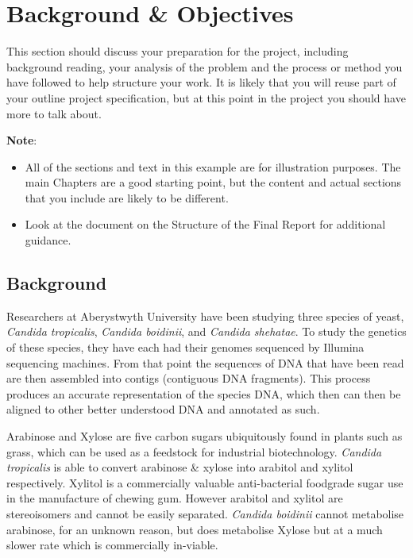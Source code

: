 \chapter{Background \& Objectives}

This section should discuss your preparation for the project, including background reading, your analysis of the problem and the process or method you have followed to help structure your work.  It is likely that you will reuse part of your outline project specification, but at this point in the project you should have more to talk about. 

\textbf{Note}: 

\begin{itemize}
   \item All of the sections and text in this example are for illustration purposes. The main Chapters are a good starting point, but the content and actual sections that you include are likely to be different.
   
   \item Look at the document on the Structure of the Final Report for additional guidance. 
   
\end{itemize}

\section{Background}
Researchers at Aberystwyth University have been studying three species of yeast, \textit{Candida tropicalis}, \textit{Candida boidinii}, and \textit{Candida shehatae}. To study the genetics of these species, they have each had their genomes sequenced by Illumina sequencing machines. From that point the sequences of DNA that have been read are then assembled into contigs (contiguous DNA fragments). This process produces an accurate representation of the species DNA, which then can then be aligned to other better understood DNA and annotated as such.

Arabinose and Xylose are five carbon sugars ubiquitously found in plants such as grass, which can be used as a feedstock for industrial biotechnology. \textit{Candida tropicalis} is able to convert arabinose \& xylose into arabitol and xylitol respectively. Xylitol is a commercially valuable anti-bacterial foodgrade sugar use in the manufacture of chewing gum. However arabitol and xylitol are stereoisomers and cannot be easily separated. \textit{Candida boidinii} cannot metabolise arabinose, for an unknown reason, but does metabolise Xylose but at a much slower rate which is commercially in-viable.

